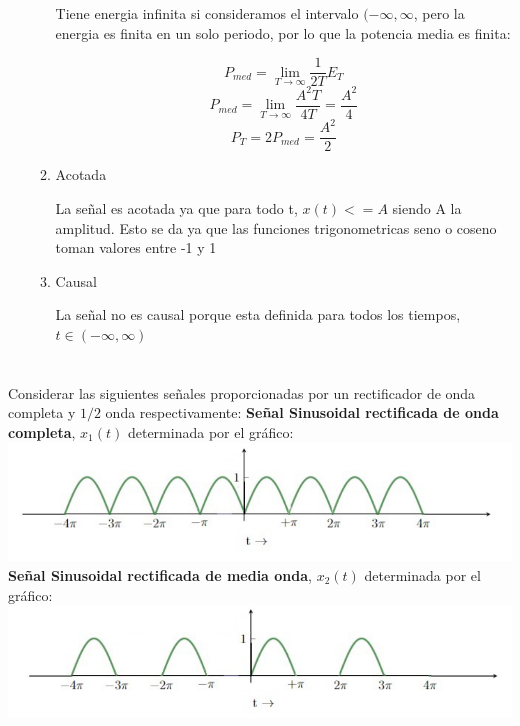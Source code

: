 \documentclass[12pt,a4paper]{report}
\begin{document}
\begin{enumerate}[label=\alph*),left=0pt]
\begin{enumerate}[label=\alph*)]
    Tiene energia infinita si consideramos el intervalo $(-\infty,\infty$, pero la energia es finita en un solo periodo,
    por lo que la potencia media es finita:

    $$P_{med} = \lim_{T \to \infty} \frac{1}{2T} E_T$$
    $$P_{med} = \lim_{T \to \infty} \frac{A^2T}{4T} = \frac{A^2}{4}$$
    $$P_T = 2 P_{med} = \frac{A^2}{2}$$
    \item Acotada

    La señal es acotada ya que para todo t, $x(t) <= A$ siendo A la amplitud. Esto se da ya que las funciones
    trigonometricas seno o coseno toman valores entre -1 y 1
    \item Causal

    La señal no es causal porque esta definida para todos los tiempos, $t \in (-\infty,\infty)$
  \end{enumerate}
\end{enumerate}

\chapter{}%
Considerar las siguientes señales proporcionadas por un rectificador de onda completa y $1/2$ onda respectivamente:
\textbf{Señal Sinusoidal rectificada de onda completa}, $x_1(t)$ determinada por el gráfico:\\
\includegraphics[width=\textwidth]{images/ej2.a.png}\\


\textbf{Señal Sinusoidal rectificada de media onda}, $x_2(t)$ determinada por el gráfico:
\includegraphics[width=\textwidth]{images/ej2.b.png}
\end{document}
